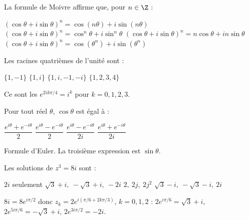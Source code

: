 \begin{question}
La formule de Moivre affirme que, pour $n\in\Z$ :
\begin{reponses}
  \bonne $(\cos\theta+i\sin\theta)^n=\cos(n\theta)+i\sin(n\theta)$
  \mauvaise $(\cos\theta+i\sin\theta)^n=\cos^n\theta+i\sin^n\theta$
  \mauvaise $(\cos\theta+i\sin\theta)^n=n\cos\theta+in\sin\theta$
  \mauvaise $(\cos\theta+i\sin\theta)^n=\cos(\theta^n)+i\sin(\theta^n)$
\end{reponses}
\end{question}

\begin{question}
Les racines quatrièmes de l'unité sont :
\begin{reponses}
  \mauvaise $\{1,-1\}$
  \mauvaise $\{1,i\}$
  \bonne $\{1,i,-1,-i\}$
  \mauvaise $\{1,2,3,4\}$
\end{reponses}
\begin{explication}
Ce sont les $e^{2ik\pi/4}=i^k$ pour $k=0,1,2,3$.
\end{explication}
\end{question}

\begin{question}
Pour tout réel $\theta$, $\cos\theta$ est égal à :
\begin{reponses}
  \bonne $\dfrac{e^{i\theta}+e^{-i\theta}}{2}$
  \mauvaise $\dfrac{e^{i\theta}-e^{-i\theta}}{2}$
  \mauvaise $\dfrac{e^{i\theta}-e^{-i\theta}}{2i}$
  \mauvaise $\dfrac{e^{i\theta}+e^{-i\theta}}{2i}$
\end{reponses}
\begin{explication}
Formule d'Euler. La troisième expression est $\sin\theta$.
\end{explication}
\end{question}

\begin{question}
Les solutions de $z^3=8i$ sont :
\begin{reponses}
  \mauvaise $2i$ seulement
  \bonne $\sqrt3+i,\ -\sqrt3+i,\ -2i$
  \mauvaise $2,\ 2j,\ 2j^2$
  \mauvaise $\sqrt3-i,\ -\sqrt3-i,\ 2i$
\end{reponses}
\begin{explication}
$8i=8e^{i\pi/2}$ donc $z_k=2e^{i(\pi/6+2k\pi/3)}$, $k=0,1,2$ : $2e^{i\pi/6}=\sqrt3+i$, $2e^{5i\pi/6}=-\sqrt3+i$, $2e^{3i\pi/2}=-2i$.
\end{explication}
\end{question}
